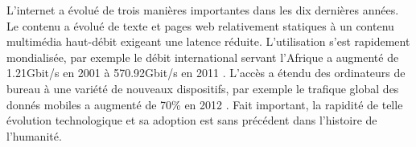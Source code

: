 
 


L'internet a évolué de trois manières importantes dans les dix dernières années. Le contenu a évolué de texte et pages web relativement statiques à un contenu multimédia haut-débit exigeant une latence réduite. L'utilisation s'est rapidement mondialisée, par exemple le débit international servant l'Afrique a augmenté de 1.21Gbit/s en 2001 à 570.92Gbit/s en 2011 \cite{InternetGlobalGrowth}. L'accès a étendu des ordinateurs de bureau à une variété de nouveaux dispositifs, par exemple le trafique global des donnés mobiles a augmenté de 70\% en 2012 \cite{CiscoVNI2013}. Fait important, la rapidité de telle évolution technologique et sa adoption est sans précédent dans l'histoire de l'humanité. 


